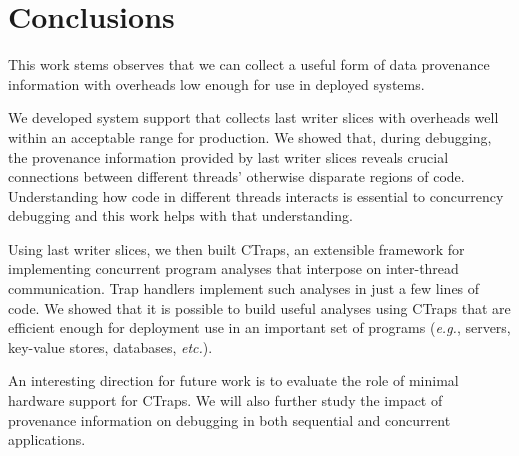 \documentclass[preprint,9pt]{sigplanconf}
\newcommand{\ctraps}{CTraps\xspace}
\begin{document}
\section{Conclusions}
This work stems observes that we can collect a useful form of data provenance
information with overheads low enough for use in deployed systems. 

We developed system support that collects last writer slices with overheads
well within an acceptable range for production.  We showed that, during
debugging, the provenance information provided by last writer slices reveals
crucial connections between different threads' otherwise disparate regions of
code.  Understanding how code in different threads interacts is essential to
concurrency debugging and this work helps with that understanding.

Using last writer slices, we then built \ctraps, an extensible framework for
implementing concurrent program analyses that interpose on inter-thread
communication.  Trap handlers implement such analyses in just a few lines of
code.  We showed that it is possible to build useful analyses using \ctraps
that are efficient enough for deployment use in an important set of programs
({\em e.g.}, servers, key-value stores, databases, {\em etc.}).  

An interesting direction for future work is to evaluate the role of minimal
hardware support for \ctraps.  We will also further study the impact of
provenance information on debugging in both sequential and concurrent
applications. 




{}

\end{document}

